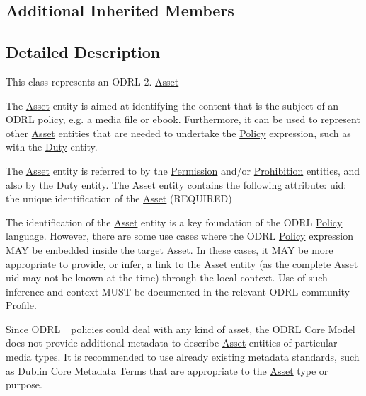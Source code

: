 \subsection*{Additional Inherited Members}


\subsection{Detailed Description}
This class represents an O\-D\-R\-L 2. \hyperlink{classodrlmodel_1_1_asset}{Asset}

The \hyperlink{classodrlmodel_1_1_asset}{Asset} entity is aimed at identifying the content that is the subject of an O\-D\-R\-L policy, e.\-g. a media file or ebook. Furthermore, it can be used to represent other \hyperlink{classodrlmodel_1_1_asset}{Asset} entities that are needed to undertake the \hyperlink{classodrlmodel_1_1_policy}{Policy} expression, such as with the \hyperlink{classodrlmodel_1_1_duty}{Duty} entity.

The \hyperlink{classodrlmodel_1_1_asset}{Asset} entity is referred to by the \hyperlink{classodrlmodel_1_1_permission}{Permission} and/or \hyperlink{classodrlmodel_1_1_prohibition}{Prohibition} entities, and also by the \hyperlink{classodrlmodel_1_1_duty}{Duty} entity. The \hyperlink{classodrlmodel_1_1_asset}{Asset} entity contains the following attribute\-: uid\-: the unique identification of the \hyperlink{classodrlmodel_1_1_asset}{Asset} (R\-E\-Q\-U\-I\-R\-E\-D)

The identification of the \hyperlink{classodrlmodel_1_1_asset}{Asset} entity is a key foundation of the O\-D\-R\-L \hyperlink{classodrlmodel_1_1_policy}{Policy} language. However, there are some use cases where the O\-D\-R\-L \hyperlink{classodrlmodel_1_1_policy}{Policy} expression M\-A\-Y be embedded inside the target \hyperlink{classodrlmodel_1_1_asset}{Asset}. In these cases, it M\-A\-Y be more appropriate to provide, or infer, a link to the \hyperlink{classodrlmodel_1_1_asset}{Asset} entity (as the complete \hyperlink{classodrlmodel_1_1_asset}{Asset} uid may not be known at the time) through the local context. Use of such inference and context M\-U\-S\-T be documented in the relevant O\-D\-R\-L community Profile.

Since O\-D\-R\-L \-\_\-policies could deal with any kind of asset, the O\-D\-R\-L Core Model does not provide additional metadata to describe \hyperlink{classodrlmodel_1_1_asset}{Asset} entities of particular media types. It is recommended to use already existing metadata standards, such as Dublin Core Metadata Terms that are appropriate to the \hyperlink{classodrlmodel_1_1_asset}{Asset} type or purpose.

